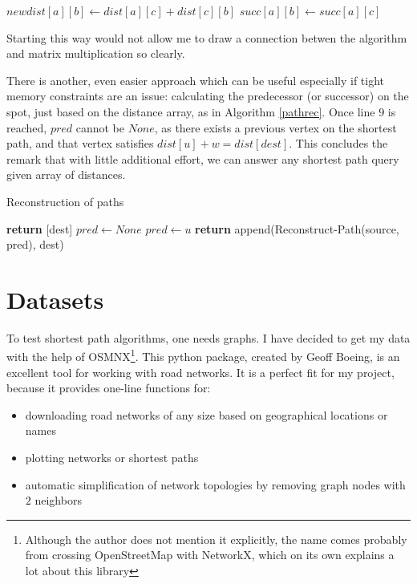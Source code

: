 \documentclass[12pt,a4paper,twoside,openright]{report}
\begin{document}
\begin{algorithm}
\begin{algorithmic}[1]
        \State $newdist[a][b] \gets dist[a][c] + dist[c][b]$
        \State $succ[a][b] \gets succ[a][c]$
    \EndIf
\end{algorithmic}
\end{algorithm}
Starting this way would not allow me to draw a connection betwen the algorithm and matrix multiplication so clearly.

There is another, even easier approach which can be useful especially if tight memory constraints are an issue: calculating the predecessor (or successor) on the spot, just based on the distance array, as in Algorithm \ref{pathrec}. Once line $9$ is reached, $pred$ cannot be $None$, as there exists a previous vertex on the shortest path, and that vertex satisfies $dist[u] + w = dist[dest]$. This concludes the remark that with little additional effort, we can answer any shortest path query given array of distances.

\begin{algorithm}
\caption{Reconstruction of paths}\label{pathrec}
\begin{algorithmic}[1]
\State \textbf{return} [dest]
\Else
    \State $pred \gets None$
    \State $pred \gets u$
    \EndIf
    \EndFor
    \State \textbf{return} append(Reconstruct-Path(source, pred), dest)
\EndIf
\EndProcedure
\end{algorithmic}
\end{algorithm}

\section{Datasets}
To test shortest path algorithms, one needs graphs. I have decided to get my data with the help of OSMNX\cite{Boeing2017}\footnote{Although the author does not mention it explicitly, the name comes probably from crossing OpenStreetMap with NetworkX, which on its own explains a lot about this library}. This python package, created by Geoff Boeing, is an excellent tool for working with road networks. It is a perfect fit for my project, because it provides one-line functions for:
\begin{itemize}
    \item downloading road networks of any size based on geographical locations or names
    \item plotting networks or shortest paths
    \item automatic simplification of network topologies by removing graph nodes with $2$ neighbors
\end{itemize} 
\end{document}
